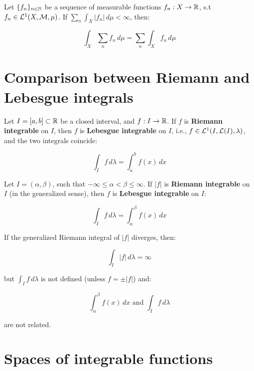 \begin{fcorollary}
    Let $\{f_n\}_{n \in \mathbb{N}}$ be a sequence of measurable functions $f_n: X \to \mathbb{R}$,
    s.t $f_n \in \mathcal{L}^1(X, \mathcal{M}, \mu)$. If $\sum_{n} \int_{X} |f_n| \, d\mu < \infty$,
    then:
    
    $$\int_{X} \sum_{n} f_n \, d\mu = \sum_{n} \int_{X} f_n \, d\mu$$
\end{fcorollary}

\section{Comparison between Riemann and Lebesgue integrals}

\begin{ftheorem}
    Let $I = [a, b] \subset \mathbb{R}$ be a closed interval, and $f: I \to \mathbb{R}$.
    If $f$ is \textbf{Riemann integrable} on $I$, then $f$ is \textbf{Lebesgue integrable} on $I$,
    i.e., $f \in \mathcal{L}^1(I, \mathcal{L}(I), \lambda)$, and the two integrals coincide:

    $$\int_{I} f \, d\lambda = \int_{a}^{b} f(x) \, dx$$

\end{ftheorem}

\vspace{1em}

\begin{ftheorem}
    Let $I = (\alpha, \beta)$, such that $-\infty \leq \alpha < \beta \leq \infty$.
    If $|f|$ is \textbf{Riemann integrable} on $I$ (in the generalized sense), 
    then $f$ is \textbf{Lebesgue integrable} on $I$:

    $$\int_{I} f \, d\lambda = \int_{\alpha}^{\beta} f(x) \, dx$$
\end{ftheorem}

\begin{fremark}
    If the generalized Riemann integral of $|f|$ diverges, then:

    $$\int_{I} |f| \, d\lambda = \infty$$

    but $\int_{I} f \, d\lambda$ is not defined (unless $f = \pm |f|$)
    and:

    $$\int_{\alpha}^{\beta} f(x) \, dx \text{ and } \int_{I} f \, d\lambda$$

    are not related.
\end{fremark}

\section{Spaces of integrable functions}

